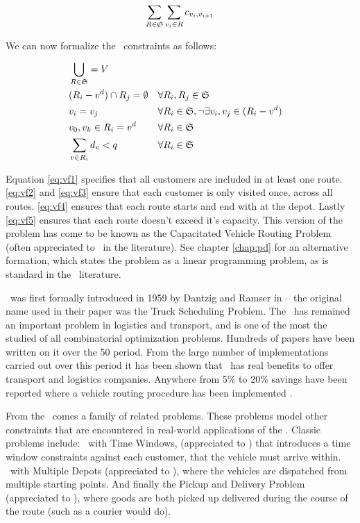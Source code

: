 \[
   \sum_{R \in \mathfrak{S}} \sum_{v_i \in R} c_{v_i, v_{i+1}}
\]

We can now formalize the \VRP\ constraints as follows:

\begin{align}
   & \bigcup_{R \in \mathfrak{S}} = V \label{eq:vf1}\\
   & (R_i - v^d) \cap R_j = \emptyset  && \forall R_i, R_j \in \mathfrak{S} \label{eq:vf2}\\
   & v_i = v_j                               && \forall R_i \in \mathfrak{S}, \lnot \exists v_i, v_j \in (R_i - v^d) \label{eq:vf3}\\
   & v_0, v_k \in R_i = v^d                  && \forall R_i \in \mathfrak{S} \label{eq:vf4}\\
   & \sum_{v \in R_i} d_v < q                && \forall R_i \in \mathfrak{S} \label{eq:vf5}
\end{align}

Equation \ref{eq:vf1} specifies that all customers are included in at least one route. \ref{eq:vf2} and \ref{eq:vf3} ensure that each customer is only visited once, across all routes. \ref{eq:vf4} ensures that each route starts and end with at the depot. Lastly \ref{eq:vf5} ensures that each route doesn't exceed it's capacity. This version of the problem has come to be known as the Capacitated Vehicle Routing Problem (often appreciated to \CVRP\ in the literature). See chapter \ref{chap:pd} for an alternative formation, which states the problem as a linear programming problem, as is standard in the \VRP\ literature.

\VRP\ was first formally introduced in 1959 by Dantzig and Ramser in \cite{Dantzig:1959} -- the original name used in their paper was the Truck Scheduling Problem. The \VRP\ has remained an important problem in logistics and transport, and is one of the most the studied of all combinatorial optimization problems. Hundreds of papers have been written on it over the 50 period. From the large number of implementations carried out over this period it has been shown that \VRP\ has real benefits to offer transport and logistics companies. Anywhere from 5\% to 20\% savings have been reported where a vehicle routing procedure has been implemented \cite{TV2001}.

From the \VRP\ comes a family of related problems. These problems model other constraints that are encountered in real-world applications of the \VRP. Classic problems include: \VRP\ with Time Windows, (appreciated to \VRPTW) that introduces a time window constraints against each customer, that the vehicle must arrive within. \VRP\ with Multiple Depots (appreciated to \MDVRP), where the vehicles are dispatched from multiple starting points. And finally the Pickup and Delivery Problem (appreciated to \PDP), where goods are both picked up delivered during the course of the route (such as a courier would do).

